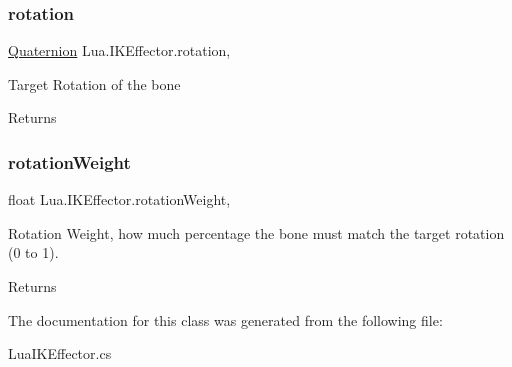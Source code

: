 \subsubsection{\texorpdfstring{rotation}{rotation}}
{\footnotesize\ttfamily \mbox{\hyperlink{class_lua_1_1_quaternion}{Quaternion}} Lua.\+I\+K\+Effector.\+rotation\hspace{0.3cm}{\ttfamily [get]}, {\ttfamily [set]}}



Target Rotation of the bone 

\begin{DoxyReturn}{Returns}

\end{DoxyReturn}
\mbox{\label{class_lua_1_1_i_k_effector_a1c101608c632fc144c0a098fc3a37986}} 
\subsubsection{\texorpdfstring{rotationWeight}{rotationWeight}}
{\footnotesize\ttfamily float Lua.\+I\+K\+Effector.\+rotation\+Weight\hspace{0.3cm}{\ttfamily [get]}, {\ttfamily [set]}}



Rotation Weight, how much percentage the bone must match the target rotation (0 to 1). 

\begin{DoxyReturn}{Returns}

\end{DoxyReturn}


The documentation for this class was generated from the following file\+:\begin{DoxyCompactItemize}
\item 
Lua\+I\+K\+Effector.\+cs\end{DoxyCompactItemize}
